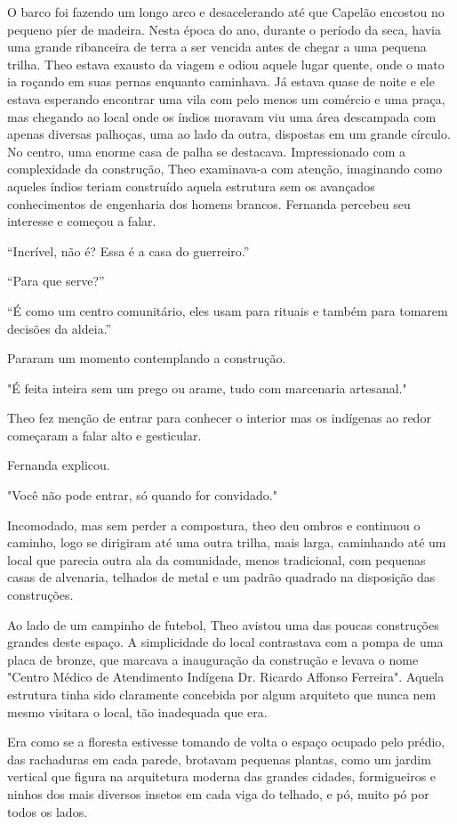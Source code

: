 O barco foi fazendo um longo arco e desacelerando até que Capelão
encostou no pequeno píer de madeira. Nesta época do ano, durante o
período da seca, havia uma grande ribanceira de terra a ser vencida
antes de chegar a uma pequena trilha. Theo estava exausto da viagem e
odiou aquele lugar quente, onde o mato ia roçando em suas pernas
enquanto caminhava. Já estava quase de noite e ele estava esperando
encontrar uma vila com pelo menos um comércio e uma praça, mas chegando
ao local onde os índios moravam viu uma área descampada com apenas
diversas palhoças, uma ao lado da outra, dispostas em um grande círculo.
No centro, uma enorme casa de palha se destacava. Impressionado com a
complexidade da construção, Theo examinava-a com atenção, imaginando
como aqueles índios teriam construído aquela estrutura sem os avançados
conhecimentos de engenharia dos homens brancos. Fernanda percebeu seu
interesse e começou a falar.

``Incrível, não é? Essa é a casa do guerreiro.''

``Para que serve?''

``É como um centro comunitário, eles usam para rituais e também para
tomarem decisões da aldeia.''

Pararam um momento contemplando a construção.

"É feita inteira sem um prego ou arame, tudo com marcenaria artesanal."

Theo fez menção de entrar para conhecer o interior mas os indígenas ao
redor começaram a falar alto e gesticular.

Fernanda explicou.

"Você não pode entrar, só quando for convidado."

Incomodado, mas sem perder a compostura, theo deu ombros e continuou o
caminho, logo se dirigiram até uma outra trilha, mais larga, caminhando
até um local que parecia outra ala da comunidade, menos tradicional, com
pequenas casas de alvenaria, telhados de metal e um padrão quadrado na
disposição das construções.

Ao lado de um campinho de futebol, Theo avistou uma das poucas
construções grandes deste espaço. A simplicidade do local contrastava
com a pompa de uma placa de bronze, que marcava a inauguração da
construção e levava o nome "Centro Médico de Atendimento Indígena Dr.
Ricardo Affonso Ferreira". Aquela estrutura tinha sido claramente
concebida por algum arquiteto que nunca nem mesmo visitara o local, tão
inadequada que era.

Era como se a floresta estivesse tomando de volta o espaço ocupado pelo
prédio, das rachaduras em cada parede, brotavam pequenas plantas, como
um jardim vertical que figura na arquitetura moderna das grandes
cidades, formigueiros e ninhos dos mais diversos insetos em cada viga do
telhado, e pó, muito pó por todos os lados.

